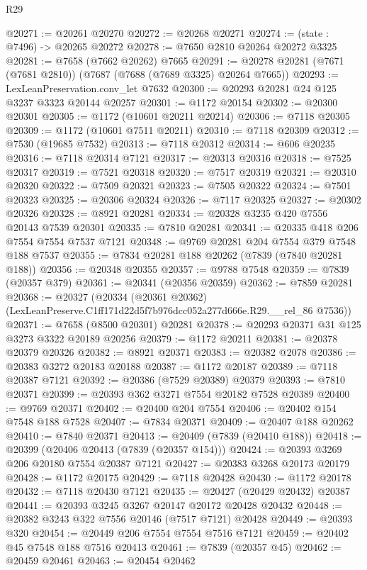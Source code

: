 \begin{lexlean}{R29}
\begin{coremodule}
@20271 := @20261 @20270
@20272 := @20268 @20271
@20274 := (state : @7496) -> @20265 @20272
@20278 := @7650 @2810 @20264 @20272 @3325
@20281 := @7658 (@7662 @20262) @7665
@20291 := @20278 @20281 (@7671 (@7681 @2810)) (@7687 (@7688 (@7689 @3325) @20264 @7665))
@20293 := LexLeanPreservation.conv_let @7632
@20300 := @20293 @20281 @24 @125 @3237 @3323 @20144 @20257
@20301 := @1172 @20154
@20302 := @20300 @20301
@20305 := @1172 (@10601 @20211 @20214)
@20306 := @7118 @20305
@20309 := @1172 (@10601 @7511 @20211)
@20310 := @7118 @20309
@20312 := @7530 (@19685 @7532)
@20313 := @7118 @20312
@20314 := @606 @20235
@20316 := @7118 @20314 @7121
@20317 := @20313 @20316
@20318 := @7525 @20317
@20319 := @7521 @20318
@20320 := @7517 @20319
@20321 := @20310 @20320
@20322 := @7509 @20321
@20323 := @7505 @20322
@20324 := @7501 @20323
@20325 := @20306 @20324
@20326 := @7117 @20325
@20327 := @20302 @20326
@20328 := @8921 @20281
@20334 := @20328 @3235 @420 @7556 @20143 @7539 @20301
@20335 := @7810 @20281
@20341 := @20335 @418 @206 @7554 @7554 @7537 @7121
@20348 := @9769 @20281 @204 @7554 @379 @7548 @188 @7537
@20355 := @7834 @20281 @188 @20262 (@7839 (@7840 @20281 @188))
@20356 := @20348 @20355
@20357 := @9788 @7548
@20359 := @7839 (@20357 @379)
@20361 := @20341 (@20356 @20359)
@20362 := @7859 @20281
@20368 := @20327
    (@20334 (@20361 @20362) (LexLeanPreserve.C1ff171d22d5f7b976dcc052a277d666e.R29.__rel_86 @7536))
@20371 := @7658 (@8500 @20301) @20281
@20378 := @20293 @20371 @31 @125 @3273 @3322 @20189 @20256
@20379 := @1172 @20211
@20381 := @20378 @20379 @20326
@20382 := @8921 @20371
@20383 := @20382 @2078
@20386 := @20383 @3272 @20183 @20188
@20387 := @1172 @20187
@20389 := @7118 @20387 @7121
@20392 := @20386 (@7529 @20389) @20379
@20393 := @7810 @20371
@20399 := @20393 @362 @3271 @7554 @20182 @7528 @20389
@20400 := @9769 @20371
@20402 := @20400 @204 @7554
@20406 := @20402 @154 @7548 @188 @7528
@20407 := @7834 @20371
@20409 := @20407 @188 @20262
@20410 := @7840 @20371
@20413 := @20409 (@7839 (@20410 @188))
@20418 := @20399 (@20406 @20413 (@7839 (@20357 @154)))
@20424 := @20393 @3269 @206 @20180 @7554 @20387 @7121
@20427 := @20383 @3268 @20173 @20179
@20428 := @1172 @20175
@20429 := @7118 @20428
@20430 := @1172 @20178
@20432 := @7118 @20430 @7121
@20435 := @20427 (@20429 @20432) @20387
@20441 := @20393 @3245 @3267 @20147 @20172 @20428 @20432
@20448 := @20382 @3243 @322 @7556 @20146 (@7517 @7121) @20428
@20449 := @20393 @320
@20454 := @20449 @206 @7554 @7554 @7516 @7121
@20459 := @20402 @45 @7548 @188 @7516 @20413
@20461 := @7839 (@20357 @45)
@20462 := @20459 @20461
@20463 := @20454 @20462

\end{coremodule}
\end{lexlean}
